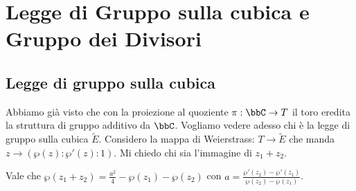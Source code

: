 \chapter{Legge di Gruppo sulla cubica e Gruppo dei Divisori}

\section{Legge di gruppo sulla cubica}
Abbiamo già visto che con la proiezione al quoziente $\pi : \bbC \rightarrow T$ il toro eredita la struttura di gruppo additivo da $\bbC$.
Vogliamo vedere adesso chi è la legge di gruppo sulla cubica $\widetilde{E}$.
Considero la mappa di Weierstrass: $T\rightarrow \widetilde{E}$ che manda $z \rightarrow (\wp(z):\wp'(z):1)$. Mi chiedo chi sia l'immagine di $z_1 + z_2$.

\begin{teorema}
  \label{leggedigruppo}
  Vale che $\wp(z_1+z_2) = \frac{a^2}{4} - \wp(z_1) - \wp(z_2) $
  con $a = \frac{\wp'(z_2) - \wp'(z_1)}{\wp(z_2) - \wp(z_1)}$.
\end{teorema}

